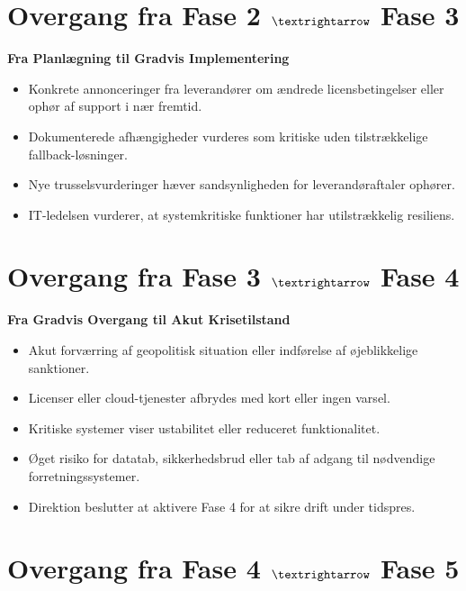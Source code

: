 \documentclass[a4paper,11pt,oneside]{book}
\def\tightlist{}
\begin{document}
\section{\texorpdfstring{Overgang fra Fase 2 \(\textrightarrow\) Fase
3}{Overgang fra Fase 2 \textbackslash textrightarrow Fase 3}}\label{overgang-fra-fase-2-textrightarrow-fase-3}

\textbf{Fra Planlægning til Gradvis Implementering}

\begin{itemize}
\tightlist
\item
  Konkrete annonceringer fra leverandører om ændrede licensbetingelser
  eller ophør af support i nær fremtid.
\item
  Dokumenterede afhængigheder vurderes som kritiske uden tilstrækkelige
  fallback-løsninger.
\item
  Nye trusselsvurderinger hæver sandsynligheden for leverandøraftaler
  ophører.
\item
  IT-ledelsen vurderer, at systemkritiske funktioner har utilstrækkelig
  resiliens.
\end{itemize}

\section{\texorpdfstring{Overgang fra Fase 3 \(\textrightarrow\) Fase
4}{Overgang fra Fase 3 \textbackslash textrightarrow Fase 4}}\label{overgang-fra-fase-3-textrightarrow-fase-4}

\textbf{Fra Gradvis Overgang til Akut Krisetilstand}

\begin{itemize}
\tightlist
\item
  Akut forværring af geopolitisk situation eller indførelse af
  øjeblikkelige sanktioner.
\item
  Licenser eller cloud-tjenester afbrydes med kort eller ingen varsel.
\item
  Kritiske systemer viser ustabilitet eller reduceret funktionalitet.
\item
  Øget risiko for datatab, sikkerhedsbrud eller tab af adgang til
  nødvendige forretningssystemer.
\item
  Direktion beslutter at aktivere Fase 4 for at sikre drift under
  tidspres.
\end{itemize}

\section{\texorpdfstring{Overgang fra Fase 4 \(\textrightarrow\) Fase
5}{Overgang fra Fase 4 \textbackslash textrightarrow Fase 5}}\label{overgang-fra-fase-4-textrightarrow-fase-5}
\end{document}
